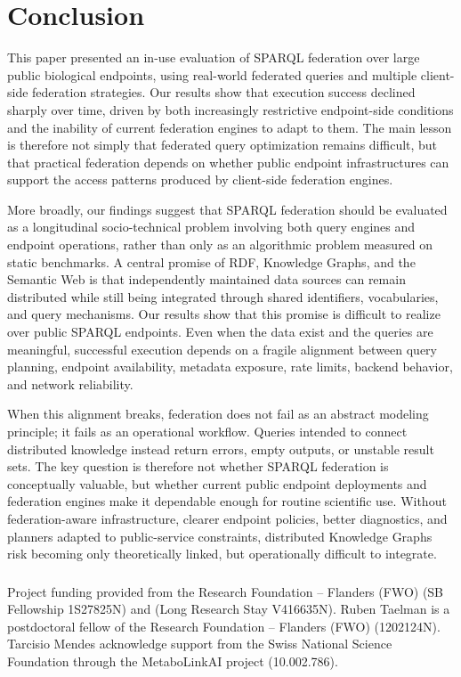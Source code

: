 \documentclass[runningheads]{llncs}
\begin{document}
\section{Conclusion}\label{sec9}
This paper presented an in-use evaluation of SPARQL federation over large public biological endpoints, using real-world federated queries and multiple client-side federation strategies. 
Our results show that execution success declined sharply over time, driven by both increasingly restrictive endpoint-side conditions and the inability of current federation engines to adapt to them. 
The main lesson is therefore not simply that federated query optimization remains difficult, but that practical federation depends on whether public endpoint infrastructures can support the access patterns produced by client-side federation engines.

More broadly, our findings suggest that SPARQL federation should be evaluated as a longitudinal socio-technical problem involving both query engines and endpoint operations, rather than only as an algorithmic problem measured on static benchmarks. 
A central promise of RDF, Knowledge Graphs, and the Semantic Web is that independently maintained data sources can remain distributed while still being integrated through shared identifiers, vocabularies, and query mechanisms. 
Our results show that this promise is difficult to realize over public SPARQL endpoints. 
Even when the data exist and the queries are meaningful, successful execution depends on a fragile alignment between query planning, endpoint availability, metadata exposure, rate limits, backend behavior, and network reliability.

When this alignment breaks, federation does not fail as an abstract modeling principle; it fails as an operational workflow. 
Queries intended to connect distributed knowledge instead return errors, empty outputs, or unstable result sets. 
The key question is therefore not whether SPARQL federation is conceptually valuable, but whether current public endpoint deployments and federation engines make it dependable enough for routine scientific use. 
Without federation-aware infrastructure, clearer endpoint policies, better diagnostics, and planners adapted to public-service constraints, distributed Knowledge Graphs risk becoming only theoretically linked, but operationally difficult to integrate.


\begin{credits}
\subsubsection{\ackname} 
Project funding provided from the Research Foundation – Flanders (FWO) (SB Fellowship 1S27825N) and (Long Research Stay V416635N).
Ruben Taelman is a postdoctoral fellow of the Research Foundation – Flanders (FWO) (1202124N).
Tarcisio Mendes acknowledge support from the Swiss National Science Foundation through the MetaboLinkAI project (10.002.786).
\end{credits}



\end{document}
